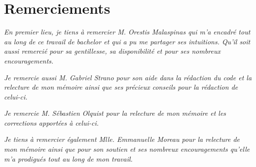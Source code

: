\chapter*{Remerciements} %

\textit{En premier lieu, je tiens à remercier M. Orestis Malaspinas qui
m'a encadré tout au long de ce travail de bachelor et qui a pu me partager ses
intuitions. Qu'il soit aussi remercié pour sa gentillesse, sa disponibilité et
pour ses nombreux encouragements.}

\textit{Je remercie aussi M. Gabriel Strano pour son aide dans la rédaction du
	code et	la relecture de mon mémoire ainsi que ses précieux conseils pour la
rédaction de celui-ci.}

\textit{Je remercie M. Sébastien Olquist pour la relecture de mon
	mémoire et les corrections apportées à celui-ci.}

\textit{Je tiens à remercier également Mlle. Emmanuelle Moreau pour la 
	relecture de mon mémoire ainsi que pour son soutien et ses nombreux 
	encouragements qu'elle m'a prodigués tout au long de mon travail.}


